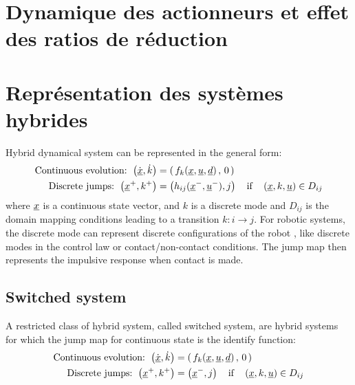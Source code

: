 \newpage
\section{Dynamique des actionneurs et effet des ratios de réduction}
\label{sec:actuatordynamic}




\newpage
\section{Représentation des systèmes hybrides}


Hybrid dynamical system can be represented in the general form:
%
\begin{align}
\text{Continuous evolution: } \left(  \dot{\underline{x}} , \dot{k} \right) &=  \left( \, f_k( \underline{x} , \underline{u} , \underline{d} ) \, , \, 0 \, \right) \\
\text{Discrete jumps: } \left(  \underline{x}^+ , k^+ \right) &=  \left( h_{ij}( \underline{x}^- , \underline{u}^- ) , j \right) \quad\text{if}\quad \left(  \underline{x} , k , \underline{u} \right) \in D_{ij}  
\end{align}
%
where $\underline{x}$ is a continuous state vector, and $k$ is a discrete mode and $D_{ij}$ is the domain mapping conditions leading to a transition $k:i \rightarrow j$. For robotic systems, the discrete mode can represent discrete configurations of the robot , like discrete modes in the control law or contact/non-contact conditions. The jump map then represents the impulsive response when contact is made. 

\subsection{Switched system}

A restricted class of hybrid system, called switched system, are hybrid systems for which the jump map for continuous state is the identify function:
%
\begin{align}
\text{Continuous evolution: } \left(  \dot{\underline{x}} , \dot{k} \right) &=  \left( \, f_k( \underline{x} , \underline{u} , \underline{d} ) \, , \, 0 \, \right) \\
\text{Discrete jumps: } \left(  \underline{x}^+ , k^+ \right) &=  \left( \underline{x}^- , j \right) \quad\text{if}\quad \left(  \underline{x} , k , \underline{u} \right) \in D_{ij} 
\end{align}
%

